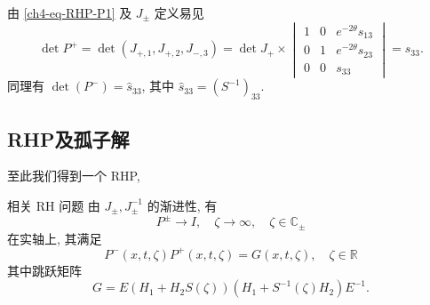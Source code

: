 由 \eqref{ch4-eq-RHP-P1} 及 $J_{\pm}$ 定义易见
\begin{equation}
    \det P^{+} = \det(J_{+,1}, J_{+,2}, J_{-,3}) = \det J_{+} \times \begin{vmatrix}
        1 & 0 & e^{-2\theta} s_{13} \\ 0 & 1 & e^{-2\theta} s_{23} \\ 0 & 0 & s_{33}
    \end{vmatrix} = s_{33}.\label{ch4-eq-det-P-s}
\end{equation}
同理有 $\det(P^{-}) = \hat{s}_{33}$, 其中 $\hat{s}_{33} = (S^{-1})_{33}$.
\subsection{RHP及孤子解}
至此我们得到一个 RHP,
\begin{definition}{相关 RH 问题}
    由 $J_{\pm}, J_{\pm}^{-1}$ 的渐进性, 有
    \begin{equation}
        P^{\pm} \to I, \quad \zeta \to \infty, \quad \zeta \in \mathbb{C}_{\pm}
        \label{ch4-eq-RHP-normalization}
    \end{equation}
    在实轴上, 其满足
    \begin{equation}
        P^{-}(x,t,\zeta) P^{+}(x,t,\zeta) = G(x,t,\zeta), \quad \zeta \in \mathbb{R} \label{ch4-eq-RHP-jump}
    \end{equation}
    其中跳跃矩阵
    \begin{equation}
        G = E(H_{1} + H_{2} S(\zeta))(H_{1} + S^{-1}(\zeta) H_{2}) E^{-1}.
    \end{equation}
\end{definition}
